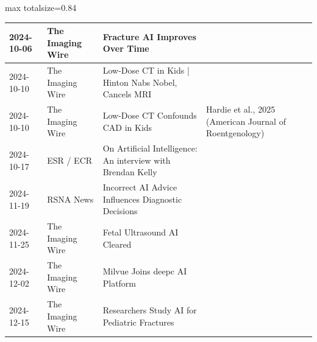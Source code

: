 \documentclass[aspectratio=169]{beamer}
\begin{document}
\begin{frame}
\begin{adjustbox}{max totalsize={\textwidth}{0.84\textheight}}
\begin{tabular}{|l|l|>{\raggedright\arraybackslash}p{}|>{\raggedright\arraybackslash}p{}|}
2024-10-06 & The Imaging Wire & Fracture AI Improves Over Time &  \\ \hline
2024-10-10 & The Imaging Wire & Low-Dose CT in Kids | Hinton Nabs Nobel, Cancels MRI &  \\ \hline
2024-10-10 & The Imaging Wire & Low-Dose CT Confounds CAD in Kids & Hardie et al., 2025 (American Journal of Roentgenology) \\ \hline
2024-10-17 & ESR / ECR & On Artificial Intelligence: An interview with Brendan Kelly &  \\ \hline
2024-11-19 & RSNA News & Incorrect AI Advice Influences Diagnostic Decisions &  \\ \hline
2024-11-25 & The Imaging Wire & Fetal Ultrasound AI Cleared &  \\ \hline
2024-12-02 & The Imaging Wire & Milvue Joins deepc AI Platform &  \\ \hline
2024-12-15 & The Imaging Wire & Researchers Study AI for Pediatric Fractures &  \\ \hline
\end{tabular}
\end{adjustbox}
\end{frame}
\end{document}
